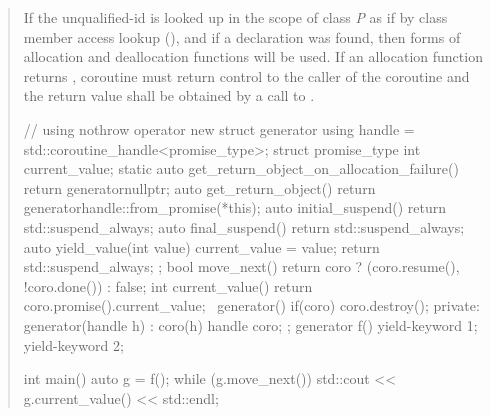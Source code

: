 \begin{quote}
\pnum
If the unqualified-id  is looked up in the scope of class \textit{P}
as if by class member access lookup (), and if a declaration was found,
 then  forms of allocation and deallocation functions will be used. If an allocation function returns , coroutine must return control to the caller of the coroutine and the return value shall be obtained by a call to .

\enterexample
\begin{codeblock}
// using nothrow operator new
struct generator {
  using handle = std::coroutine_handle<promise_type>;
  struct promise_type {
    int current_value;
    static auto get_return_object_on_allocation_failure() { return generator{nullptr}; }
    auto get_return_object() { return generator{handle::from_promise(*this)}; }
    auto initial_suspend() { return std::suspend_always{}; }
    auto final_suspend() { return std::suspend_always{}; }
    auto yield_value(int value) { 
      current_value = value; 
      return std::suspend_always{};
    }
  };
  bool move_next() { return coro ? (coro.resume(), !coro.done()) : false; }
  int current_value() { return coro.promise().current_value; }
  ~generator() { if(coro) coro.destroy(); }
private:
  generator(handle h) : coro(h) {}
  handle coro;
};
generator f() { yield-keyword 1;  yield-keyword 2; }
 
int main() {
  auto g = f();
  while (g.move_next()) std::cout << g.current_value() << std::endl;
}

\end{codeblock}
\exitexample




%

\end{quote}